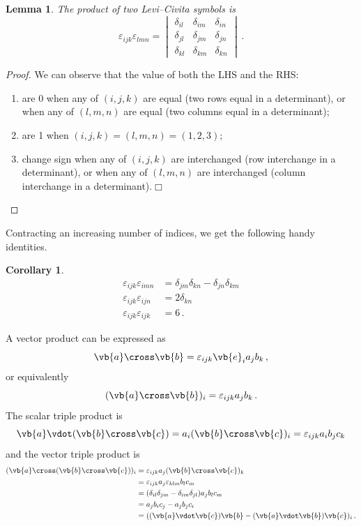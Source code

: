 \documentclass{article}
\theoremstyle{plain}\theoremheaderfont{\normalfont\itshape}\theorembodyfont{\rmfamily}\theoremseparator{.}\newtheorem*{rem}{Remark}\newtheorem*{ex}{Example}\newtheorem*{proof}{Proof}\newtheorem*{altp}{Alternative proof}
\theoremstyle{plain}\theoremheaderfont{\normalfont\bfseries}\theorembodyfont{\rmfamily}\theoremseparator{.}\newtheorem{thm}{Theorem}[section]\newtheorem{lem}[thm]{Lemma}\newtheorem{prop}[thm]{Proposition}\newtheorem*{cor}{Corollary}\newtheorem{defn}[thm]{Definition}\newtheorem{clm}[thm]{Claim}\newtheorem{clminproof}{Claim}
\theoremstyle{break}\theoremheaderfont{\normalfont\itshape}\theorembodyfont{\rmfamily}\theoremseparator{.\medskip}\newtheorem*{proofskip}{Proof}\newtheorem*{exs}{Examples}\newtheorem*{rems}{Remarks}
\theoremstyle{break}\theoremheaderfont{\normalfont\bfseries}\theorembodyfont{\rmfamily}\theoremseparator{.\medskip}\newtheorem{lemskip}[thm]{Lemma}\newtheorem{defnskip}[thm]{Definition}\newtheorem{propskip}[thm]{Proposition}\newtheorem{thmskip}[thm]{Theorem}
\numberwithin{equation}{section}
\newcommand{\qed}{\hfill\ensuremath{\Box}}
\begin{document}
	\begin{lem}
		The product of two Levi--Civita symbols is
		\[
			\varepsilon_{ijk}\varepsilon_{lmn}=\begin{vmatrix}
			\delta_{il} & \delta_{im} & \delta_{in}\\
			\delta_{jl} & \delta_{jm} & \delta_{jn}\\
			\delta_{kl} & \delta_{km} & \delta_{kn}
		\end{vmatrix}\,.
		\]
	\end{lem}
	\begin{proof}
		We can observe that the value of both the LHS and the RHS:
		\begin{enumerate}[topsep=0pt]
			\item are 0 when any of \((i,j,k)\) are equal (two rows equal in a determinant), or when any of \((l,m,n)\) are equal (two columns equal in a determinant);
			\item are 1 when \((i,j,k) = (l,m,n) = (1,2,3)\);
			\item change sign when any of \((i,j,k)\) are interchanged (row interchange in a determinant), or when any of \((l,m,n)\) are interchanged (column interchange in a determinant).\qed
		\end{enumerate}
	\end{proof}
	Contracting an increasing number of indices, we get the following handy identities.
	\begin{cor}
		\begin{align*}
			\varepsilon_{ijk}\varepsilon_{imn}&=\delta_{jm}\delta_{kn}-\delta_{jn}\delta_{km}\\
			\varepsilon_{ijk}\varepsilon_{ijn}&=2\delta_{kn}\\
			\varepsilon_{ijk}\varepsilon_{ijk}&=6\,.
		\end{align*}
	\end{cor}

	A vector product can be expressed as
	\[\vb{a}\cross\vb{b}=\varepsilon_{ijk}\vb{e}_ia_jb_k\,,\]
	or equivalently
	\[(\vb{a}\cross\vb{b})_i=\varepsilon_{ijk}a_jb_k\,.\]
	The scalar triple product is
	\[\vb{a}\vdot(\vb{b}\cross\vb{c})=a_i(\vb{b}\cross\vb{c})_i=\varepsilon_{ijk}a_ib_jc_k\]
	and the vector triple product is
	\begin{align*}
		(\vb{a}\cross(\vb{b}\cross\vb{c}))_i&=\varepsilon_{ijk}a_j(\vb{b}\cross\vb{c})_k\\
		&=\varepsilon_{ijk}a_j\varepsilon_{klm}b_lc_m\\
		&=(\delta_{il}\delta_{jm}-\delta_{im}\delta_{jl})a_jb_lc_m\\
		&=a_jb_ic_j-a_jb_jc_i\\
		&=((\vb{a}\vdot\vb{c})\vb{b}-(\vb{a}\vdot\vb{b})\vb{c})_i\,.
	\end{align*}
\end{document}
